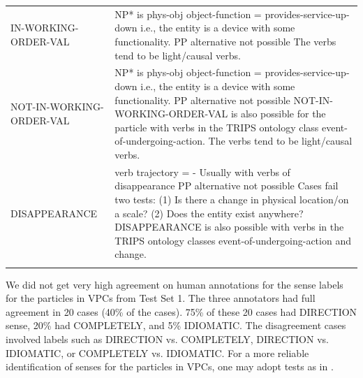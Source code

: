 \documentclass[output=paper,modfonts,nonflat]{langsci/langscibook}
\begin{document}
\begin{table}
\begin{tabularx}{\textwidth}{p{45mm}Q}
  IN-WORKING-ORDER-VAL
    & NP* is phys-obj \newline object-function = provides-service-up-down \newline i.e., the entity is a device with some functionality. \newline PP alternative not possible \newline The verbs tend to be light/causal verbs. \\
\tablevspace
  NOT-IN-WORKING-ORDER-VAL
    & NP* is phys-obj \newline object-function = provides-service-up-down \newline i.e., the entity is a device with some functionality. \newline PP alternative not possible \newline NOT-IN-WORKING-ORDER-VAL is also possible for the particle  with verbs in the TRIPS ontology class event-of-undergoing-action. \newline The verbs tend to be light/causal verbs. \\
\tablevspace
  DISAPPEARANCE
    & verb trajectory = - \newline Usually with verbs of disappearance \newline PP alternative not possible \newline Cases fail two tests: (1) Is there a change in physical location/on a scale? (2) Does the entity exist anywhere? \newline DISAPPEARANCE is also possible with verbs in the TRIPS ontology classes event-of-undergoing-action and change.\\
  \lspbottomrule
 \end{tabularx}%
\end{table}

We did not get very high agreement on human annotations for the sense labels for the particles in VPCs from Test Set 1. The three annotators had full agreement in 20 cases (40\% of the cases). 75\% of these 20 cases had DIRECTION sense, 20\% had COMPLETELY, and 5\% IDIOMATIC. The disagreement cases involved labels such as DIRECTION vs. COMPLETELY, DIRECTION vs. IDIOMATIC, or COMPLETELY vs. IDIOMATIC. For a more reliable identification of senses for the particles in VPCs, one may adopt tests as in .
\end{document}
